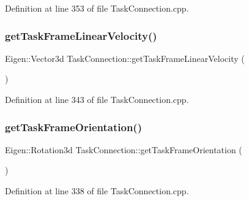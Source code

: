 Definition at line 353 of file Task\+Connection.\+cpp.

\hypertarget{classocra__recipes_1_1TaskConnection_ab0948b1336f171e607ca79ca03a466c5}{}\label{classocra__recipes_1_1TaskConnection_ab0948b1336f171e607ca79ca03a466c5} 
\subsubsection{\texorpdfstring{get\+Task\+Frame\+Linear\+Velocity()}{getTaskFrameLinearVelocity()}}
{\footnotesize\ttfamily Eigen\+::\+Vector3d Task\+Connection\+::get\+Task\+Frame\+Linear\+Velocity (\begin{DoxyParamCaption}{ }\end{DoxyParamCaption})}



Definition at line 343 of file Task\+Connection.\+cpp.

\hypertarget{classocra__recipes_1_1TaskConnection_a4163584c89cc8680131bd473b9359ffb}{}\label{classocra__recipes_1_1TaskConnection_a4163584c89cc8680131bd473b9359ffb} 
\subsubsection{\texorpdfstring{get\+Task\+Frame\+Orientation()}{getTaskFrameOrientation()}}
{\footnotesize\ttfamily Eigen\+::\+Rotation3d Task\+Connection\+::get\+Task\+Frame\+Orientation (\begin{DoxyParamCaption}{ }\end{DoxyParamCaption})}



Definition at line 338 of file Task\+Connection.\+cpp.

\hypertarget{classocra__recipes_1_1TaskConnection_a263fc00649e98cfa61393f63cfe9f84a}{}\label{classocra__recipes_1_1TaskConnection_a263fc00649e98cfa61393f63cfe9f84a} 
